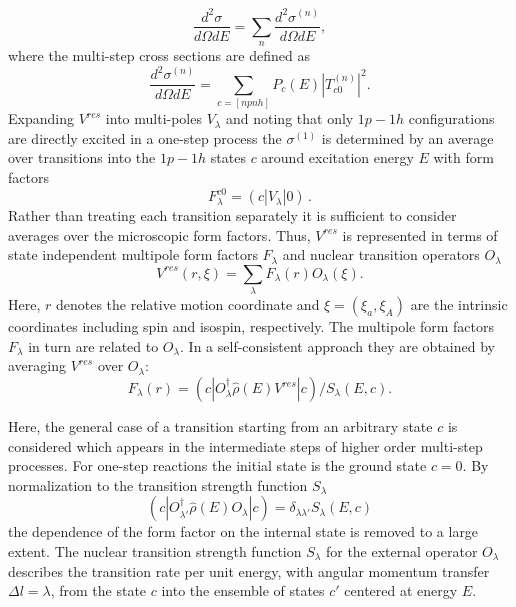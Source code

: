 \documentclass[twocolumn,amsmath,amssymb,10pt,groupedaddress,a4paper]{revtex4}
\begin{document}
\begin{equation}
\frac{d^{2}\sigma}{d\Omega dE}=\sum_{n}{\frac{d^{2}\sigma^{(n)}}{d\Omega dE}},\label{sigma0}
\end{equation}
\noindent where the multi-step cross sections are defined as
\begin{equation}
\frac{d^{2}\sigma^{(n)}}{d\Omega dE}=\sum_{c=[npnh]}{P_{c}(E)|T_{c0}^{(n)}|^{2}}.\label{sign}
\end{equation}
\noindent Expanding $V^{res}$ into multi-poles $V_{\lambda}$ and noting that
only $1p-1h$ configurations are directly excited in a one-step process
the $\sigma^{(1)}$ is determined by an average over transitions into
the $1p-1h$ states $c$ around excitation energy $E$ with form factors
\begin{equation}
F_{\lambda}^{c0}=(c|V_{\lambda}|0)\,.
\end{equation}
\noindent Rather than treating each transition separately it is sufficient to
consider averages over the microscopic form factors. Thus, $V^{res}$
is represented in terms of state independent multipole form factors
$F_{\lambda}$ and nuclear transition operators $O_{\lambda}$
\begin{equation}
V^{res}(r,\xi)=\sum_{\lambda}{F_{\lambda}(r)O_{\lambda}(\xi)}.\label{vres}
\end{equation}
\noindent Here, $r$ denotes the relative motion coordinate and $\xi=(\xi_{a},\xi_{A})$
are the intrinsic coordinates including spin and isospin, respectively.
The multipole form factors $F_{\lambda}$ in turn are related to $O_{\lambda}$.
In a self-consistent approach they are obtained by averaging $V^{res}$
over $O_{\lambda}$:
\begin{equation}
F_{\lambda}(r)=(c|O_{\lambda}^{\dag}\hat{\rho}(E)V^{res}|c)/S_{\lambda}(E,c).\label{formf}
\end{equation}

Here, the general case of a transition starting from an arbitrary
state $c$ is considered which appears in the intermediate steps of
higher order multi-step processes. For one-step reactions the initial
state is the ground state $c=0$. By normalization to the transition
strength function $S_{\lambda}$
\begin{equation}
(c|O_{\lambda'}^{\dag}\hat{\rho}(E)O_{\lambda}|c)=\delta_{\lambda\lambda'}S_{\lambda}(E,c)\label{slambda}
\end{equation}
\noindent the dependence of the form factor on the internal state is removed
to a large extent.
The nuclear transition strength function $S_{\lambda}$ for the external operator
$O_{\lambda}$ describes the transition rate per unit energy, with angular momentum transfer
$\Delta l=\lambda$, from the state
$c$ into the ensemble of states $c'$ centered at energy $E$.
\end{document}
